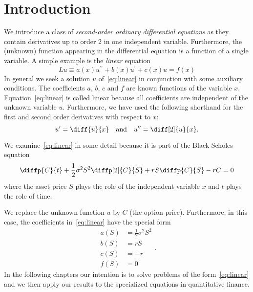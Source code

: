 \section{Introduction}


\begin{frame}[t]{\secname}
We introduce a class of \emph{second-order ordinary differential equations}
as they contain derivatives up to order $2$ in one independent variable.
Furthermore, the (unknown) function appearing in the differential equation
is a function of a single variable. A simple example is the \emph{linear}
equation
\begin{equation}\label{eq:linear}
	Lu\equiv
	a\left(x\right)u^{\prime\prime}+
	b\left(x\right)u^{\prime}+c\left(x\right)u=
	f\left(x\right)
\end{equation}
In general we seek a solution $u$ of~\eqref{eq:linear} in conjunction
with some auxiliary conditions. The coefficients $a$, $b$, $c$ and $f$
are known functions of the variable $x$. Equation~\eqref{eq:linear} is
called linear because all coefficients are independent of the unknown
variable $u$. Furthermore, we have used the following shorthand for
the first and second order derivatives with respect to $x$:
\begin{equation}
	u^{\prime}
	=\diff{u}{x}\quad\text{and}\quad u^{\prime\prime}=
	\diff[2]{u}{x}.
\end{equation}
\end{frame}

\begin{frame}[t]{\secname}
We examine~\eqref{eq:linear} in some detail because it is part of
the Black-Scholes equation
\begin{equation}
	\diffp{C}{t}+
	\frac{1}{2}\sigma^{2}S^{2}\diffp[2]{C}{S}+
	rS\diffp{C}{S}-rC=0
\end{equation}
where the asset price $S$ plays the role of the independent variable
$x$ and $t$ plays the role of time.

We replace the unknown function $u$ by $C$ (the option price).
Furthermore, in this case, the coefficients in~\eqref{eq:linear} have
the special form
\begin{equation}
	\begin{split}
		a\left(S\right)&=\frac{1}{2}\sigma^{2}S^{2}\\
		b\left(S\right)&=rS\\
		c\left(S\right)&=-r\\
		f\left(S\right)&=0
	\end{split}.
\end{equation}
In the following chapters our intention is to solve problems of the
form~\eqref{eq:linear} and we then apply our results to the specialized
equations in quantitative finance.
\end{frame}

